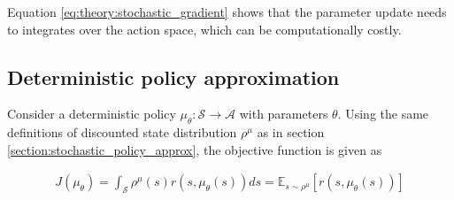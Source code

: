 \documentclass[class=book, crop=false]{standalone}
\begin{document}
Equation \eqref{eq:theory:stochastic_gradient} shows that the parameter update needs to integrates over the action space, which can be computationally costly.

\subsection{Deterministic policy approximation}
Consider a deterministic policy $\mu_{\theta}: \mathcal{S} \to \mathcal{A}$ with parameters $\theta$. Using the same definitions of discounted state distribution $\rho^{\mu}$ as in section \ref{section:stochastic_policy_approx}, the objective function is given as 

\begin{equation}
   \begin{aligned}\label{eq:theory:objective_expected_deterministic}
    J(\mu_{\theta}) =
    \int_{\mathcal{S}}
    \rho^{\mu}(s)r(s,\mu_{\theta}(s)) ds = \mathbb{E}_{s\sim \rho^{\mu}}[r(s,\mu_{\theta}(s))]
\end{aligned} 
\end{equation}
\end{document}
